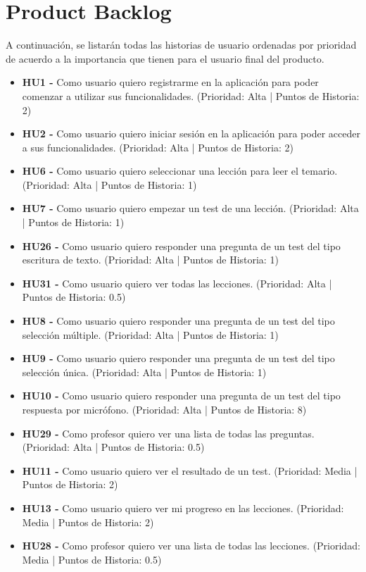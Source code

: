 \section{Product Backlog}
A continuación, se listarán todas las historias de usuario ordenadas por prioridad de acuerdo a la importancia que tienen para el usuario final del producto.
\begin{itemize}
    \item \textbf{HU1 - } Como usuario quiero registrarme en la aplicación para poder comenzar a utilizar sus funcionalidades. (Prioridad: Alta | Puntos de Historia: 2)
    \item \textbf{HU2 - } Como usuario quiero iniciar sesión en la aplicación para poder acceder a sus funcionalidades. (Prioridad: Alta | Puntos de Historia: 2)
    \item \textbf{HU6 - } Como usuario quiero seleccionar una lección para leer el temario. (Prioridad: Alta | Puntos de Historia: 1)
    \item \textbf{HU7 - } Como usuario quiero empezar un test de una lección. (Prioridad: Alta | Puntos de Historia: 1)
    \item \textbf{HU26 - } Como usuario quiero responder una pregunta de un test del tipo escritura de texto. (Prioridad: Alta | Puntos de Historia: 1)
    \item \textbf{HU31 - } Como usuario quiero ver todas las lecciones. (Prioridad: Alta | Puntos de Historia: 0.5)
    \item \textbf{HU8 - } Como usuario quiero responder una pregunta de un test del tipo selección múltiple. (Prioridad: Alta | Puntos de Historia: 1)
    \item \textbf{HU9 - } Como usuario quiero responder una pregunta de un test del tipo selección única. (Prioridad: Alta | Puntos de Historia: 1)
    \item \textbf{HU10 - } Como usuario quiero responder una pregunta de un test del tipo respuesta por micrófono. (Prioridad: Alta | Puntos de Historia: 8)
    \item \textbf{HU29 - } Como profesor quiero ver una lista de todas las preguntas. (Prioridad: Alta | Puntos de Historia: 0.5)
    \item \textbf{HU11 - } Como usuario quiero ver el resultado de un test. (Prioridad: Media | Puntos de Historia: 2)
    \item \textbf{HU13 - } Como usuario quiero ver mi progreso en las lecciones. (Prioridad: Media | Puntos de Historia: 2)
    \item \textbf{HU28 - } Como profesor quiero ver una lista de todas las lecciones. (Prioridad: Media | Puntos de Historia: 0.5)

\end{itemize}
